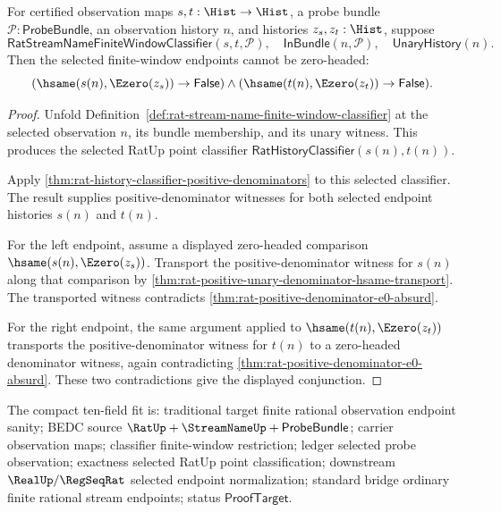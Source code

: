 
\begin{theorem}
\label{thm:rat-stream-name-finite-window-selected-zero-head-exclusion}
For certified observation maps $s,t:\Hist\to\Hist$, a probe bundle
$\mathcal{P}:\mathsf{ProbeBundle}$, an observation history $n$, and histories
$z_s,z_t:\Hist$, suppose
$$
\mathsf{RatStreamNameFiniteWindowClassifier}(s,t,\mathcal{P}),
\quad
\mathsf{InBundle}(n,\mathcal{P}),
\quad
\mathsf{UnaryHistory}(n).
$$
Then the selected finite-window endpoints cannot be zero-headed:
$$
(\hsame(s(n),\Ezero(z_s))\to\mathsf{False})\land
(\hsame(t(n),\Ezero(z_t))\to\mathsf{False}).
$$
\end{theorem}
\begin{proof}
Unfold Definition~\ref{def:rat-stream-name-finite-window-classifier} at the
selected observation $n$, its bundle membership, and its unary witness. This
produces the selected RatUp point classifier
$\mathsf{RatHistoryClassifier}(s(n),t(n))$.

Apply \autoref{thm:rat-history-classifier-positive-denominators} to this
selected classifier. The result supplies positive-denominator witnesses for
both selected endpoint histories $s(n)$ and $t(n)$.

For the left endpoint, assume a displayed zero-headed comparison
$\hsame(s(n),\Ezero(z_s))$. Transport the positive-denominator witness for
$s(n)$ along that comparison by
\autoref{thm:rat-positive-unary-denominator-hsame-transport}. The transported
witness contradicts \autoref{thm:rat-positive-denominator-e0-absurd}.

For the right endpoint, the same argument applied to
$\hsame(t(n),\Ezero(z_t))$ transports the positive-denominator witness for
$t(n)$ to a zero-headed denominator witness, again contradicting
\autoref{thm:rat-positive-denominator-e0-absurd}. These two contradictions
give the displayed conjunction.
\end{proof}

The compact ten-field fit is: traditional target finite rational observation
endpoint sanity; BEDC source $\RatUp+\StreamNameUp+\mathsf{ProbeBundle}$;
carrier observation maps; classifier finite-window restriction; ledger
selected probe observation; exactness selected RatUp point classification;
downstream $\RealUp/\RegSeqRat$ selected endpoint normalization; standard
bridge ordinary finite rational stream endpoints; status
$\mathsf{ProofTarget}$.

